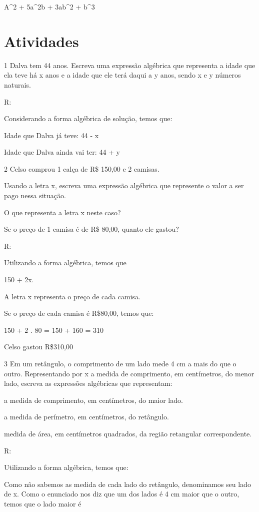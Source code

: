{A^2 + 5a^2b + 3ab^2 + b^3

\section{Atividades}

\num{1} Dalva tem 44 anos. Escreva uma expressão algébrica que representa a
idade que ela teve há x anos e a idade que ele terá daqui a y anos,
sendo x e y números naturais.

R:

Considerando a forma algébrica de solução, temos que:

Idade que Dalva já teve: 44 - x

Idade que Dalva ainda vai ter: 44 + y

\num{2} Celso comprou 1 calça de R\$ 150,00 e 2 camisas.
\item Usando a letra x, escreva uma expressão algébrica que represente o
valor a ser pago nessa situação.
\item O que representa a letra x neste caso?
\item Se o preço de 1 camisa é de R\$ 80,00, quanto ele gastou?

R:
\item Utilizando a forma algébrica, temos que

150 + 2x.
\item A letra x representa o preço de cada camisa.
\item Se o preço de cada camisa é R\$80,00, temos que:

150 + 2 . 80 = 150 + 160 = 310

Celso gastou R\$310,00

\num{3} Em um retângulo, o comprimento de um lado mede 4 cm a mais do que o
outro. Representando por x a medida de comprimento, em centímetros, do
menor lado, escreva as expressões algébricas que representam:
\item a medida de comprimento, em centímetros, do maior lado.
\item a medida de perímetro, em centímetros, do retângulo.
\item medida de área, em centímetros quadrados, da região retangular
correspondente.

R:
\item Utilizando a forma algébrica, temos que:

Como não sabemos as medida de cada lado do retângulo, denominamos seu
lado de x. Como o enunciado nos diz que um dos lados é 4 cm maior que o
outro, temos que o lado maior é

}
